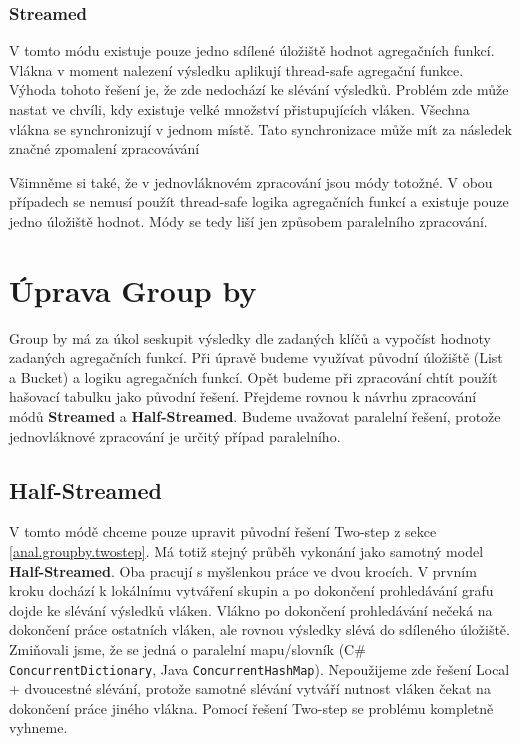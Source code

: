 \subsubsection{Streamed}

V tomto módu existuje pouze jedno sdílené úložiště hodnot agregačních funkcí.
Vlákna v moment nalezení výsledku aplikují thread-safe agregační funkce.
Výhoda tohoto řešení je, že zde nedochází ke slévání výsledků.
Problém zde může nastat ve chvíli, kdy existuje velké množství přistupujících vláken.
Všechna vlákna se synchronizují v jednom místě.
Tato synchronizace může mít za následek značné zpomalení zpracovávání

\smallskip
Všimněme si také, že v jednovláknovém zpracování jsou módy totožné.
V obou případech se nemusí použít thread-safe logika agregačních funkcí a existuje pouze jedno úložiště hodnot.
Módy se tedy liší jen způsobem paralelního zpracování.


\section{Úprava Group by} \label{anal.improvement.groupby}

Group by má za úkol seskupit výsledky dle zadaných klíčů a vypočíst hodnoty zadaných agregačních funkcí.
Při úpravě budeme využívat původní úložiště (List a Bucket) a logiku agregačních funkcí.
Opět budeme při zpracování chtít použít hašovací tabulku jako původní řešení.
Přejdeme rovnou k návrhu zpracování módů \textbf{Streamed} a \textbf{Half-Streamed}.
Budeme uvažovat paralelní řešení, protože jednovláknové zpracování je určitý případ paralelního.

\subsection{Half-Streamed} 

V tomto módě chceme pouze upravit původní řešení Two-step z sekce \ref{anal.groupby.twostep}.
Má totiž stejný průběh vykonání jako samotný model \textbf{Half-Streamed}.
Oba pracují s myšlenkou práce ve dvou krocích.
V prvním kroku dochází k lokálnímu vytváření skupin a po dokončení prohledávání grafu dojde ke slévání výsledků vláken.
Vlákno po dokončení prohledávání nečeká na dokončení práce ostatních vláken, ale rovnou výsledky slévá do sdíleného úložiště.
Zmiňovali jsme, že se jedná o paralelní mapu/slovník (C\# \texttt{ConcurrentDictionary}, Java \texttt{ConcurrentHashMap}).
Nepoužijeme zde řešení Local + dvoucestné slévání, protože samotné slévání vytváří nutnost vláken čekat na dokončení práce jiného vlákna.
Pomocí řešení Two-step se problému kompletně vyhneme.


